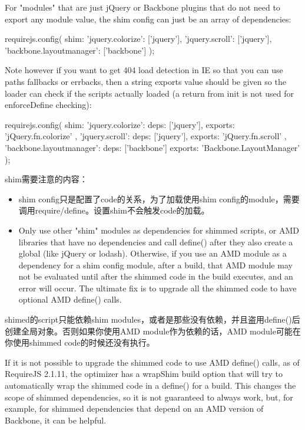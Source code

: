 For "modules" that are just jQuery or Backbone plugins that do not need to export any module value, the shim config can just be an array of dependencies:

\begin{JavaScript}
requirejs.config({
    shim: {
        'jquery.colorize': ['jquery'],
        'jquery.scroll': ['jquery'],
        'backbone.layoutmanager': ['backbone']
    }
});
\end{JavaScript}

Note however if you want to get 404 load detection in IE so that you can use paths fallbacks or errbacks, then a string exports value should be given so the loader can check if the scripts actually loaded (a return from init is not used for enforceDefine checking):

\begin{JavaScript}
requirejs.config({
    shim: {
        'jquery.colorize': {
            deps: ['jquery'],
            exports: 'jQuery.fn.colorize'
        },
        'jquery.scroll': {
            deps: ['jquery'],
            exports: 'jQuery.fn.scroll'
        },
        'backbone.layoutmanager': {
            deps: ['backbone']
            exports: 'Backbone.LayoutManager'
        }
    }
});
\end{JavaScript}


shim需要注意的内容：
\begin{itemize}
\item shim config只是配置了code的关系，为了加载使用shim config的module，需要调用require/define。设置shim不会触发code的加载。
\item Only use other "shim" modules as dependencies for shimmed scripts, or AMD libraries that have no dependencies and call define() after they also create a global (like jQuery or lodash). Otherwise, if you use an AMD module as a dependency for a shim config module, after a build, that AMD module may not be evaluated until after the shimmed code in the build executes, and an error will occur. The ultimate fix is to upgrade all the shimmed code to have optional AMD define() calls.
\end{itemize}
\item shimed的script只能依赖shim modules，或者是那些没有依赖，并且盗用define()后创建全局对象。否则如果你使用AMD module作为依赖的话，AMD module可能在你使用shimmed code的时候还没有执行。

\item If it is not possible to upgrade the shimmed code to use AMD define() calls, as of RequireJS 2.1.11, the optimizer has a wrapShim build option that will try to automatically wrap the shimmed code in a define() for a build. This changes the scope of shimmed dependencies, so it is not guaranteed to always work, but, for example, for shimmed dependencies that depend on an AMD version of Backbone, it can be helpful.

